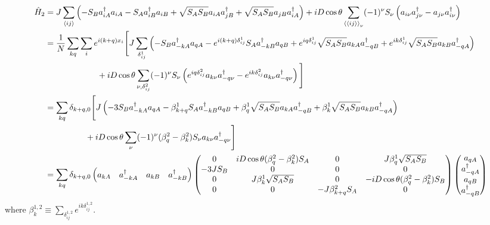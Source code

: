 \documentclass{article}
\begin{document}
\begin{align}
	\hat H_2 &= J \sum_{\braket{ij}} \left( - S_B a_{iA}^\dagger a_{iA} - S_A a_{iB}^\dagger a_{iB} + \sqrt{S_A S_B} a_{iA} a_{jB}^\dagger + \sqrt{S_A S_B} a_{jB} a_{iA}^\dagger \right) + i D \cos\theta \sum_{\braket{\braket{ij}}_\nu} (-1)^\nu S_\nu \left( a_{i\nu} a_{j\nu}^\dagger - a_{j\nu} a_{i\nu}^\dagger \right) \\
%
	&= \frac{1}{N} \sum_{kq} \sum_i e^{i(k+q)x_i} \Bigg[ J \sum_{\delta_{ij}^1} \left( -S_B a_{-kA}^\dagger a_{qA} - e^{i(k+q)\delta_{ij}^1} S_A a_{-kB}^\dagger a_{qB} + e^{iq\delta_{ij}^1} \sqrt{S_A S_B} a_{kA} a_{-qB}^\dagger + e^{ik\delta_{ij}^1} \sqrt{S_A S_B} a_{kB} a_{-qA}^\dagger \right) \\
	&\hspace{2.2cm} + iD\cos\theta \sum_{\nu,\delta_{ij}^2} (-1)^\nu S_\nu \left( e^{iq\delta_{ij}^2} a_{k\nu} a_{-q\nu}^\dagger - e^{ik\delta_{ij}^2} a_{k\nu} a_{-q\nu}^\dagger \right) \Bigg] \\
%
	&= \sum_{kq} \delta_{k+q,0} \Bigg[ J \left( -3 S_B a_{-kA}^\dagger a_{qA} - \beta_{k+q}^1 S_A a_{-kB}^\dagger a_{qB} + \beta_q^1 \sqrt{S_A S_B} a_{kA} a_{-qB}^\dagger + \beta_k^1 \sqrt{S_A S_B} a_{kB} a_{-qA}^\dagger \right) \\
	&\hspace{1.7cm} + iD\cos\theta \sum_\nu (-1)^\nu (\beta_q^2 - \beta_k^2) S_\nu a_{k\nu} a_{-q\nu}^\dagger \Bigg] \\
%
	&= \sum_{kq} \delta_{k+q,0} \begin{pmatrix}
		a_{kA} & a_{-kA}^\dagger & a_{kB} & a_{-kB}^\dagger
	\end{pmatrix} \begin{pmatrix}
		0 & iD\cos\theta (\beta_q^2 - \beta_k^2) S_A & 0 & J \beta_q^1 \sqrt{S_A S_B} \\
		-3J S_B & 0 & 0 & 0 \\
		0 & J \beta_k^1 \sqrt{S_A S_B} & 0 & -iD\cos\theta (\beta_q^2 - \beta_k^2) S_B \\
		0 & 0 & -J \beta_{k+q}^2 S_A & 0
	\end{pmatrix} \begin{pmatrix}
		a_{qA} \\ a_{-qA}^\dagger \\ a_{qB} \\ a_{-qB}^\dagger
	\end{pmatrix}
\end{align}
where $\beta_k^{1,2} \equiv \sum_{\delta_{ij}^{1,2}} e^{ik\delta_{ij}^{1,2}}$. \\
\end{document}
